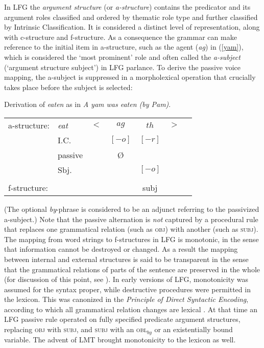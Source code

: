 In LFG the \textit{argument structure} (or \textit{a-structure}) contains the predicator and its argument roles classified and ordered by thematic role type and further classified by  Intrinsic Classification.  It is considered a distinct level of representation, along with c-structure and f-structure.  As a consequence the grammar can make reference to the initial item in a-structure, such as the agent (\textit{ag}) in (\ref{yam}), which is considered the `most prominent' role and often called the \textit{a-subject} (`argument structure subject') in LFG parlance.  To derive the passive voice mapping, the a-subject is suppressed in a morpholexical operation that crucially takes place before the subject is selected:  

 \begin{exe}
\ex\label{yam2}{Derivation of \textit{eaten} as in \textit{A yam was eaten (by Pam)}.\\
\begin{tabular}[t]{@{}lllccll}
a-structure: &{\it eat}& $<$& $ag$ & $th$   & $>$ & \\
             & I.C.      &    & $[-o]$ & $[-r]$   &   & \\
             & passive      &    & \O  &    &   & \\
             &  Sbj.     &    &  &       $[-o]$     &              & \\
             &       &    &    & \vline &    & \\
f-structure: &       &    & &{\sc subj} &   &
\end{tabular}
  }
\end{exe}
(The optional \textit{by}-phrase is considered to be an adjunct referring to the passivized a-subject.)  Note that the passive alternation is \textit{not} captured by a procedural rule that replaces one grammatical relation (such as \textsc{obj}) with another (such as \textsc{subj}).   The mapping from word strings to f-structures in LFG is monotonic, in the sense that information cannot be destroyed or changed.  As a result the mapping between internal and external structures is said to be transparent in the sense that the grammatical relations of parts of the sentence are preserved in the whole (for discussion of this point, see \citet[Chapter 5]{BATW2015a}).  In early versions of LFG, monotonicity was assumed for the syntax proper, while destructive procedures were permitted in the lexicon.  This was canonized in the \textit{Principle of Direct Syntactic Encoding}, according to which all grammatical relation changes are lexical \citep{Bresnan82a-ed}.  At that time an LFG passive rule operated on fully specified predicate argument structures, replacing \textsc{obj} with \textsc{subj}, and \textsc{subj} with an \textsc{obl$_{by}$} or an existentially bound variable.  The advent of LMT brought monotonicity to the lexicon as well.  


